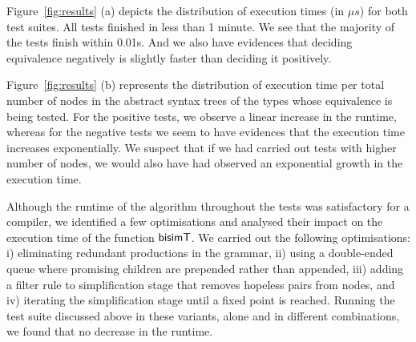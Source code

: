 Figure~\ref{fig:results} (a) depicts the distribution of execution times 
(in $\mu s$) for both test suites. All tests finished in less
than 1 minute. We see that the majority of the tests finish within 0.01s.
And we also have evidences that deciding equivalence negatively is
slightly faster than deciding it positively.



Figure~\ref{fig:results} (b) represents the distribution of execution
time per total number of nodes in the abstract syntax trees of the types
whose equivalence is being tested. For the positive tests, we observe a
linear increase in the runtime, whereas for the negative tests
we seem to have evidences that the execution time increases exponentially.
We suspect that if we had carried out tests with higher number of nodes,
we would also have had observed an exponential growth in 
the execution time.


Although the runtime of the algorithm throughout the tests was
satisfactory for a compiler, we identified a few optimisations 
and analysed their impact on the execution time of the
function $\mathsf{bisimT}$. We carried out the following optimisations:
i) eliminating redundant productions in the grammar,
ii) using a double-ended queue where promising children are prepended
  rather than appended,
iii) adding a filter rule to simplification stage that removes hopeless
  pairs from nodes, and
iv) iterating the simplification stage until a fixed point is reached.
%
Running the test suite discussed above in these variants, alone and
in different combinations, we found that no decrease in the runtime.


